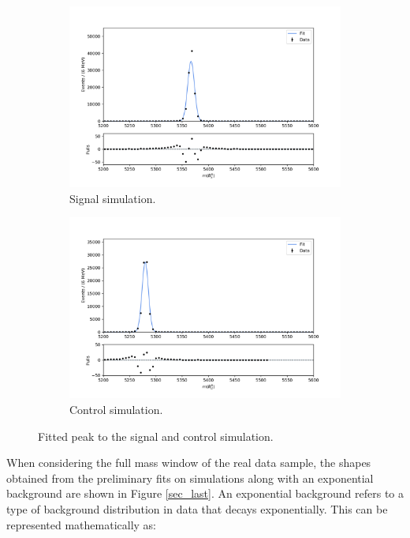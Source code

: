     \begin{figure}[H]
        \centering
        \begin{subfigure}[b]{0.49\linewidth}
            \centering
            \includegraphics[width=0.99\linewidth]{Figure/second.png}
            \caption{Signal simulation.}
            \label{fit_signal_peak}
        \end{subfigure}
        \hfill
        \begin{subfigure}[b]{0.49\linewidth}
            \centering
            \includegraphics[width=0.99\linewidth]{Figure/third.png}
            \caption{Control simulation.}
            \label{fit_control_peak}
        \end{subfigure}
        \caption{Fitted peak to the signal and control simulation.}
    \end{figure}

    When considering the full mass window of the real data sample, the shapes obtained from the preliminary fits on simulations along with an exponential background are shown in Figure \ref{sec_last}. An exponential background refers to a type of background distribution in data that decays exponentially. This can be represented mathematically as:\\

